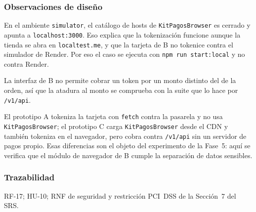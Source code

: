 \subsubsection{Observaciones de diseño}

En el ambiente \texttt{simulator}, el catálogo de hosts de \texttt{KitPagosBrowser} es cerrado y apunta a \texttt{localhost:3000}. Eso explica que la tokenización funcione aunque la tienda se abra en \texttt{localtest.me}, y que la tarjeta de B no tokenice contra el simulador de Render. Por eso el caso se ejecuta con \texttt{npm run start:local} y no contra Render.

La interfaz de B no permite cobrar un token por un monto distinto del de la orden, así que la atadura al monto se comprueba con la suite que lo hace por \texttt{/v1/api}.

El prototipo A tokeniza la tarjeta con \texttt{fetch} contra la pasarela y no usa \texttt{KitPagosBrowser}; el prototipo C carga \texttt{KitPagosBrowser} desde el CDN y también tokeniza en el navegador, pero cobra contra \texttt{/v1/api} sin un servidor de pagos propio. Esas diferencias son el objeto del experimento de la Fase~5: aquí se verifica que el módulo de navegador de B cumple la separación de datos sensibles.

\subsubsection{Trazabilidad}

RF-17; HU-10; RNF de seguridad y restricción PCI~DSS de la Sección~7 del SRS.
